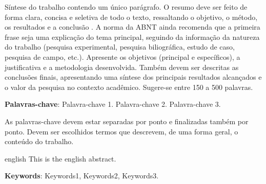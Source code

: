 
\setlength{\absparsep}{18pt} %
\begin{resumo}
Síntese do trabalho contendo um único parágrafo. O resumo deve ser feito de forma clara, concisa e seletiva de todo o texto, ressaltando o objetivo, o método, os resultados e a conclusão  \cite{NBR6028:2003}. A norma da ABNT ainda recomenda que  a primeira frase seja uma explicação do tema principal, seguindo da informação da natureza do trabalho (pesquisa experimental, pesquisa biliográfica, estudo de caso, pesquisa de campo, etc.). Apresente os objetivos (principal e específicos), a justificativa e a metodologia desenvolvida. Também devem ser descritas as conclusões finais, apresentando uma síntese dos principais resultados alcançados e o valor da pesquisa no contexto acadêmico. Sugere-se entre 150 a 500 palavras.

 \vspace{\onelineskip}
 \noindent
 \textbf{Palavras-chave}: Palavra-chave 1. Palavra-chave 2. Palavra-chave 3. 

As palavras-chave devem estar separadas por ponto e finalizadas também por ponto. Devem ser escolhidos termos  que descrevem, de uma forma geral, o conteúdo do trabalho.
\end{resumo}

\begin{resumo}[Abstract]
 \begin{otherlanguage*}{english}
   This is the english abstract.


   \vspace{\onelineskip}
   \noindent 
   \textbf{Keywords}: Keywords1, Keywords2, Keywords3.
 \end{otherlanguage*}
\end{resumo}